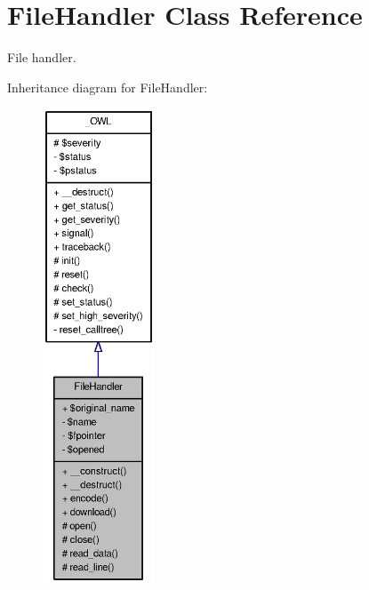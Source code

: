 \section{FileHandler Class Reference}
\label{classFileHandler}


File handler.  




Inheritance diagram for FileHandler:\nopagebreak
\begin{figure}[H]
\begin{center}
\leavevmode
\includegraphics[height=400pt]{classFileHandler__inherit__graph}
\end{center}
\end{figure}


